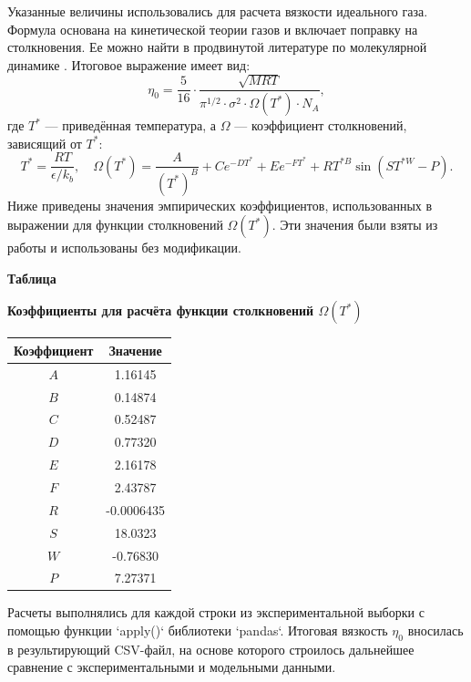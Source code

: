 \documentclass[a4paper,12pt]{article}
\newcommand{\TableNumberRight}{
  \refstepcounter{table}%
  \noindent\hfill\textbf{Таблица \thetable}
}
\begin{document}
      Указанные величины использовались для расчета вязкости идеального газа. Формула основана на кинетической теории газов и включает поправку на столкновения. Ее можно найти в продвинутой литературе по молекулярной динамике \cite{голубев2013вязкость}. Итоговое выражение имеет вид:
      \[
      \eta_0 = \frac{5}{16} \cdot \frac{\sqrt{MRT}}{\pi^{1/2} \cdot \sigma^2 \cdot \Omega(T^*) \cdot N_A},
      \]
      где $T^*$ — приведённая температура, а $\Omega$ — коэффициент столкновений, зависящий от $T^*$:
      \[
      T^* = \frac{RT}{\epsilon/k_b}, \quad
      \Omega(T^*) = \frac{A}{(T^*)^B} + C e^{-D T^*} + E e^{-F T^*} + R T^{*B} \sin(S T^{*W} - P).
      \]
      Ниже приведены значения эмпирических коэффициентов, использованных в выражении для функции столкновений $\Omega(T^*)$. Эти значения были взяты из работы \cite{neufeld1972collision} и использованы без модификации.
      \begin{table}[ht]
        \TableNumberRight
        \begin{center}
          \textbf{Коэффициенты для расчёта функции столкновений $\Omega(T^*)$}
          \vspace*{\fill}
        \end{center}
      
        \vspace{0.8ex}
        \noindent
        \begin{tabular}{|c|S|}
          \hline
          \textbf{Коэффициент} & {\textbf{Значение}} \\
          \hline
          $A$ & 1.16145 \\
          $B$ & 0.14874 \\
          $C$ & 0.52487 \\
          $D$ & 0.77320 \\
          $E$ & 2.16178 \\
          $F$ & 2.43787 \\
          $R$ & -0.0006435 \\
          $S$ & 18.0323 \\
          $W$ & -0.76830 \\
          $P$ & 7.27371 \\
          \hline
        \end{tabular}
        \label{tab:neufeld_coeffs}
      \end{table}
      
      Расчеты выполнялись для каждой строки из экспериментальной выборки с помощью функции `apply()` библиотеки `pandas`. Итоговая вязкость $\eta_0$ вносилась в результирующий CSV-файл, на основе которого строилось дальнейшее сравнение с экспериментальными и модельными данными.      
      
\end{document}

